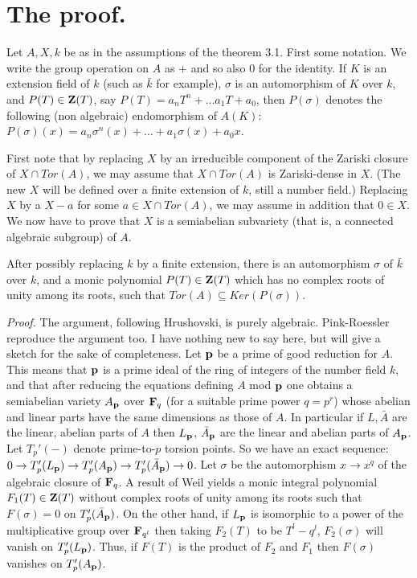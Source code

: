 \section{The proof.}
Let $A,X,k$ be as in the assumptions of the
theorem 3.1. First some notation. We write the
group operation on
$A$ as $+$ and so also $0$ for the identity. If
$K$ is an extension field of $k$ (such as
${\bar k}$ for example),
$\sigma$ is an automorphism of $K$ over
$k$, and $P(T)\in {\bf Z}(T)$, say $P(T) =
a_{n}T^{n} + ... a_{1}T + a_{0}$, then
$P(\sigma)$ denotes the following (non
algebraic) endomorphism of $A(K)$:
$P(\sigma)(x) = a_{n}\sigma^{n}(x) + ... +
a_{1}\sigma(x) + a_{0}x$.

\vspace{5mm}
\noindent
First note that by replacing $X$ by an
irreducible component of the Zariski closure
of $X\cap Tor(A)$, we may assume that $X\cap
Tor(A)$ is Zariski-dense in $X$. (The new $X$
will be defined over a finite extension of
$k$, still a number field.) Replacing $X$ by a
$X-a$ for some $a\in X\cap Tor(A)$, we may
assume in addition that $0\in X$. We now have
to prove that $X$ is a semiabelian subvariety
(that is, a connected algebraic subgroup) of
$A$.

\begin{Lemma} After possibly replacing $k$
by a finite extension, there is an automorphism
$\sigma$ of ${\bar k}$ over $k$, and a monic
polynomial $P(T)\in {\bf Z}(T)$ which has no
complex roots of unity among its roots, such
that $Tor(A) \subseteq Ker(P(\sigma))$.
\end{Lemma}
{\em Proof.} The argument, following
Hrushovski, is purely algebraic. Pink-Roessler
reproduce the argument too. I have nothing new
to say here, but will give a sketch for the
sake of completeness. Let ${\bf p}$ be a prime
of good reduction for $A$. This means that
${\bf p}$ is a prime ideal of the ring of
integers of the number field $k$, and that
after reducing the equations defining $A$ mod
${\bf p}$ one obtains a semiabelian variety
$A_{\bf p}$ over ${\bf F}_{q}$ (for a suitable
prime power $q = p^{r}$) whose abelian and
linear parts have the same dimensions as those
of $A$. In particular if $L, {\bar A}$ are the
linear, abelian parts of $A$ then
$L_{\bf p}$, ${\bar A}_{\bf p}$ are the linear
and abelian parts of $A_{\bf p}$. Let
$T_{p}'(-)$ denote prime-to-$p$ torsion
points. So we have an exact sequence:
\newline
$0 \rightarrow T_{p}'(L_{\bf p}) \rightarrow
T_{p}'(A_{\bf p}) \rightarrow T_{p}'({\bar
A}_{\bf p}) \rightarrow 0$. Let $\sigma$ be
the automorphism $x\rightarrow x^{q}$ of the
algebraic closure of ${\bf F}_{q}$. A result of
Weil
\cite{Weil} yields a monic integral polynomial
$F_{1}(T)\in{\bf Z}(T)$ without complex roots
of unity among its roots such that $F(\sigma)
= 0$ on $T_{p}'({\bar A}_{\bf p})$. On the
other hand, if $L_{\bf p}$ is isomorphic to a
power  of the multiplicative group over ${\bf
F}_{q^{l}}$ then taking $F_{2}(T)$ to be
$T^{l}-q^{l}$, $F_{2}(\sigma)$ will vanish on
$T_{p}'(L_{\bf p})$. Thus, if $F(T)$ is the
product of $F_{2}$ and $F_{1}$ then
$F(\sigma)$ vanishes on $T_{p}'(A_{\bf p})$.


